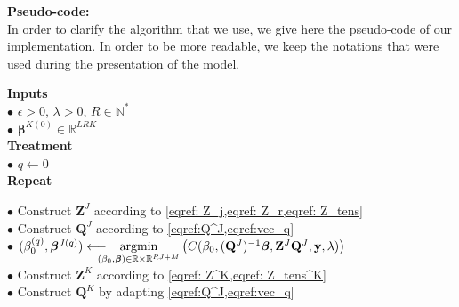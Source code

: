 \documentclass[10pt]{article}
\begin{document}
{\fontsize{12}{8}\selectfont \noindent \textbf{Pseudo-code:}}\\[1 pt] 
In order to clarify the algorithm that we use, we give here the pseudo-code of our implementation. In order to be more readable, we keep the notations that were used during the presentation of the model.\\[5 pt]
\newpage
\begin{mdframed}[leftmargin=0cm, rightmargin=4cm]
\noindent \textbf{Inputs}\\
\phantom{a}\hspace{5 pt} $\bullet$ $\epsilon >0$, $\lambda >0$, $R \in \mathbb{N}^{*}$\\[2 pt]
\phantom{a}\hspace{5 pt} $\bullet$ $\bm{\beta}^{K(0)} \in \mathbb{R}^{LRK}$\\[4 pt]
\textbf{Treatment}\\
\phantom{a}\hspace{5 pt} $\bullet$ $q \leftarrow 0$\\[2 pt]
\phantom{a}\hspace{5 pt}  \textbf{Repeat}\\[2 pt]
\phantom{a}\hspace{22 pt} $\bullet$ Construct $\mathbf{Z}^J$ according to \cref{eqref: Z_j,eqref: Z_r,eqref: Z_tens}\\[2 pt]
\phantom{a}\hspace{25 pt} $\bullet$ Construct $\mathbf{Q}^J$ according to \cref{eqref:Q^J,eqref:vec_q}\\[2 pt]
\phantom{a}\hspace{25 pt}  $\bullet$ $(\beta_0^{(q)}, \bm{\beta}^{J {(q)}}) \longleftarrow \hspace{-10 pt} \underset{(\beta_0, \bm{\beta}) \in \mathbb{R} \times \mathbb{R}^{RJ + M}}{\text{argmin}} \left( C(\beta_0, (\mathbf{Q}^J)^{-1}\bm{\beta},\mathbf{Z}^J \mathbf{Q}^J, \mathbf{y}, \lambda) \right)$\\[2 pt]
\phantom{a}\hspace{25 pt} $\bullet$ Construct $\mathbf{Z}^K$ according to \cref{eqref: Z^K,eqref: Z_tens^K}\\[3 pt]
\phantom{a}\hspace{25 pt} $\bullet$ Construct $\mathbf{Q}^K$ by adapting \cref{eqref:Q^J,eqref:vec_q}\\[2 pt]

\end{mdframed}
\end{document}
